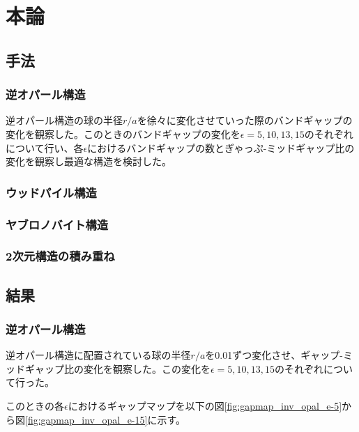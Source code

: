 \documentclass[platex,dvipdfmx]{jsreport}
\numberwithin{equation}{section}
\begin{document}
\chapter{本論}

\section{手法}
\subsection{逆オパール構造}
逆オパール構造の球の半径$r / a$を徐々に変化させていった際のバンドギャップの変化を観察した。このときのバンドギャップの変化を$\epsilon = 5, 10, 13, 15$のそれぞれについて行い、各$\epsilon$におけるバンドギャップの数とぎゃっぷ-ミッドギャップ比の変化を観察し最適な構造を検討した。
\subsection{ウッドパイル構造}
\subsection{ヤブロノバイト構造}
\subsection{2次元構造の積み重ね}


\section{結果}
\subsection{逆オパール構造}
逆オパール構造に配置されている球の半径$r / a$を0.01ずつ変化させ、ギャップ-ミッドギャップ比の変化を観察した。この変化を$\epsilon = 5, 10, 13, 15$のそれぞれについて行った。

このときの各$\epsilon$におけるギャップマップを以下の図\ref{fig:gapmap_inv_opal_e-5}から図\ref{fig:gapmap_inv_opal_e-15}に示す。
\end{document}

